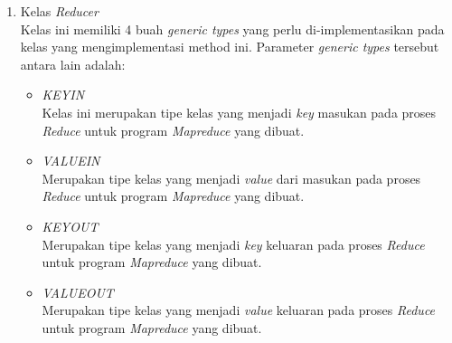 \begin{enumerate}
	\item{Kelas \textit{Reducer}}\\
	Kelas ini memiliki 4 buah \textit{generic types} yang perlu di-implementasikan pada kelas yang mengimplementasi method ini. Parameter \textit{generic types} tersebut antara lain adalah:
	\begin{itemize}
		\item{\textit{KEYIN}}\\
		Kelas ini merupakan tipe kelas yang menjadi \textit{key} masukan pada proses \textit{Reduce} untuk program \textit{Mapreduce} yang dibuat.		
		\item{\textit{VALUEIN}}\\
		Merupakan tipe kelas yang menjadi \textit{value} dari masukan pada proses \textit{Reduce} untuk program \textit{Mapreduce} yang dibuat.
		\item{\textit{KEYOUT}}\\
		Merupakan tipe kelas yang menjadi \textit{key} keluaran pada proses \textit{Reduce} untuk program \textit{Mapreduce} yang dibuat.
		\item{\textit{VALUEOUT}}\\
		Merupakan tipe kelas yang menjadi \textit{value} keluaran pada proses \textit{Reduce} untuk program \textit{Mapreduce} yang dibuat.
	\end{itemize}
\end{enumerate}

